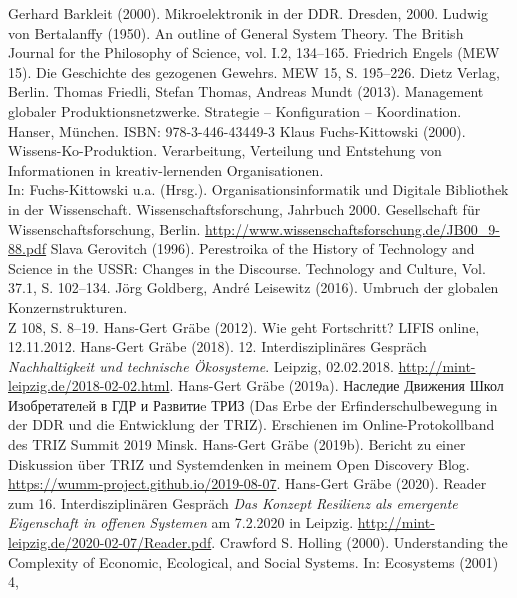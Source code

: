 \documentclass[11pt,a4paper]{article}
\begin{document}
\begin{thebibliography}{xxx}
 Gerhard Barkleit (2000). Mikroelektronik in der
  DDR. Dresden, 2000.
 Ludwig von Bertalanffy (1950). An outline of General
  System Theory. The British Journal for the Philosophy of Science, vol. I.2,
  134–165.
 Friedrich Engels (MEW 15). Die Geschichte des gezogenen
  Gewehrs.  MEW 15, S. 195--226. Dietz Verlag, Berlin.
 Thomas Friedli, Stefan Thomas, Andreas Mundt (2013).
  Management globaler Produktionsnetzwerke. Strategie – Konfiguration –
  Koordination. Hanser, München. ISBN: 978-3-446-43449-3
 Klaus Fuchs-Kittowski (2000).  Wissens-Ko-Produktion.
  Verarbeitung, Verteilung und Entstehung von Informationen in
  kreativ-lernenden Organisationen.\\ In: Fuchs-Kittowski u.a.
  (Hrsg.). Organisationsinformatik und Digitale Bibliothek in der
  Wissenschaft. Wissenschaftsforschung, Jahrbuch 2000. Gesellschaft für
  Wissenschaftsforschung, Berlin.
  \url{http://www.wissenschaftsforschung.de/JB00_9-88.pdf}
 Slava Gerovitch (1996). Perestroika of the History of
  Technology and Science in the USSR: Changes in the Discourse. Technology and
  Culture, Vol. 37.1, S. 102--134.
 Jörg Goldberg, André Leisewitz (2016). Umbruch der
  globalen Konzernstrukturen.\\ Z 108, S. 8--19.
 Hans-Gert Gräbe (2012). Wie geht Fortschritt? LIFIS
  online, 12.11.2012.
 Hans-Gert Gräbe (2018).  12. Interdisziplinäres Gespräch
  \emph{Nachhaltigkeit und technische Ökosysteme}. Leipzig, 02.02.2018. 
  \url{http://mint-leipzig.de/2018-02-02.html}.
 Hans-Gert Gräbe (2019a).
  \foreignlanguage{russian}{Наследие Движения Школ Изобретателeй в ГДР и
    Развитиe ТРИЗ} (Das Erbe der Erfinderschulbewegung in der DDR und die
  Entwicklung der TRIZ). Erschienen im Online-Protokollband des TRIZ Summit
  2019 Minsk.
 Hans-Gert Gräbe (2019b).  Bericht zu einer Diskussion
  über TRIZ und Systemdenken in meinem Open Discovery Blog.
  \url{https://wumm-project.github.io/2019-08-07}.
 Hans-Gert Gräbe (2020). Reader zum 16. Interdisziplinären
  Gespräch \emph{Das Konzept Resilienz als emergente Eigenschaft in offenen
    Systemen} am 7.2.2020 in Leipzig.
  \url{http://mint-leipzig.de/2020-02-07/Reader.pdf}.
 Crawford S. Holling (2000). Understanding the Complexity
  of Economic, Ecological, and Social Systems. In: Ecosystems (2001) 4,

\end{thebibliography}
\end{document}
